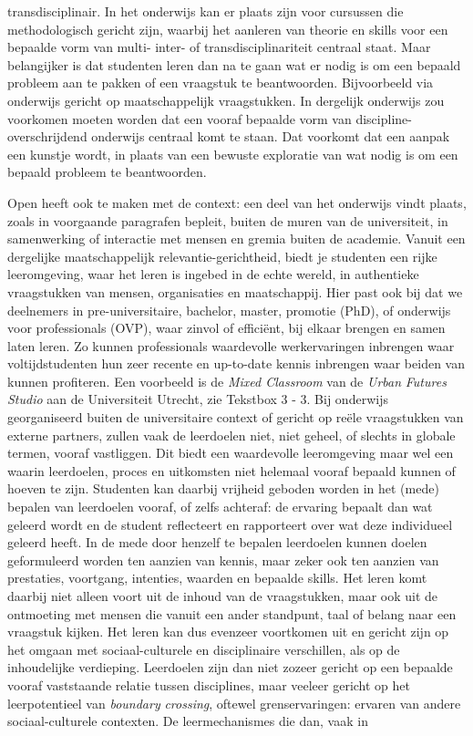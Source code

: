 \documentclass[smallauthor, chapterhaspagenum, nochapterinheader, pagenuminheader,  bigchapnum,medium2, tocpages, garamond, titleinheader]{jote-book}
\begin{document}
transdisciplinair. In het onderwijs kan er plaats zijn voor cursussen die methodologisch gericht zijn, waarbij het aanleren van theorie en skills voor een bepaalde vorm van multi- inter- of transdisciplinariteit centraal staat. Maar belangijker is dat studenten leren dan na te gaan wat er nodig is om een bepaald probleem aan te pakken of een vraagstuk te beantwoorden. Bijvoorbeeld via onderwijs gericht op maatschappelijk vraagstukken. In dergelijk onderwijs zou voorkomen moeten worden dat een vooraf bepaalde vorm van discipline-overschrijdend onderwijs centraal komt te staan. Dat voorkomt dat een aanpak een kunstje wordt, in plaats van een bewuste exploratie van wat nodig is om een bepaald probleem te beantwoorden.



	Open heeft ook te maken met de context: een deel van het onderwijs vindt plaats, zoals in voorgaande paragrafen bepleit, buiten de muren van de universiteit, in samenwerking of interactie met mensen en gremia buiten de academie. Vanuit een dergelijke maatschappelijk relevantie-gerichtheid, biedt je studenten een rijke leeromgeving, waar het leren is ingebed in de echte wereld, in authentieke vraagstukken van mensen, organisaties en maatschappij. Hier past ook bij dat we deelnemers in pre-universitaire, bachelor, master, promotie (PhD), of onderwijs voor professionals (OVP), waar zinvol of efficiënt, bij elkaar brengen en samen laten leren. Zo kunnen professionals waardevolle werkervaringen inbrengen waar voltijdstudenten hun zeer recente en up-to-date kennis inbrengen waar beiden van kunnen profiteren. Een voorbeeld is de \emph{Mixed Classroom} van de \emph{Urban }\emph{Future}\emph{s}\emph{ Studio} aan de Universiteit Utrecht, zie Tekstbox 3 - 3. Bij onderwijs georganiseerd buiten de universitaire context of gericht op reële vraagstukken van externe partners, zullen vaak de leerdoelen niet, niet geheel, of slechts in globale termen, vooraf vastliggen. Dit biedt een waardevolle leeromgeving maar wel een waarin leerdoelen, proces en uitkomsten niet helemaal vooraf bepaald kunnen of hoeven te zijn. Studenten kan daarbij vrijheid geboden worden in het (mede) bepalen van leerdoelen vooraf, of zelfs achteraf: de ervaring bepaalt dan wat geleerd wordt en de student reflecteert en rapporteert over wat deze individueel geleerd heeft. In de mede door henzelf te bepalen leerdoelen kunnen doelen geformuleerd worden ten aanzien van kennis, maar zeker ook ten aanzien van prestaties, voortgang, intenties, waarden en bepaalde skills. Het leren komt daarbij niet alleen voort uit de inhoud van de vraagstukken, maar ook uit de ontmoeting met mensen die vanuit een ander standpunt, taal of belang naar een vraagstuk kijken. Het leren kan dus evenzeer voortkomen uit en gericht zijn op het omgaan met sociaal-culturele en disciplinaire verschillen, als op de inhoudelijke verdieping. Leerdoelen zijn dan niet zozeer gericht op een bepaalde vooraf vaststaande relatie tussen disciplines, maar veeleer gericht op het leerpotentieel van \emph{boundary}\emph{ crossing}, oftewel grenservaringen: ervaren van andere sociaal-culturele contexten. De leermechanismes die dan, vaak in 
\end{document}
